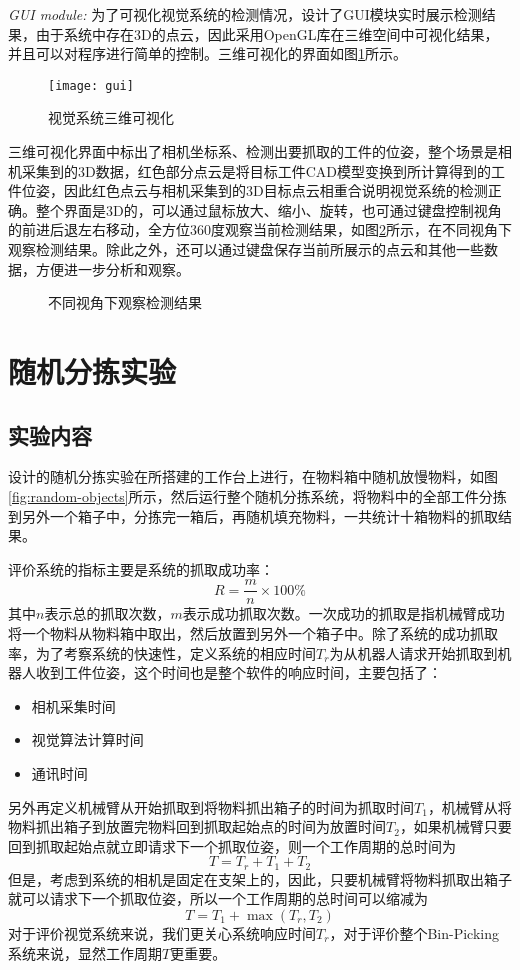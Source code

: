 \emph{GUI module:}
为了可视化视觉系统的检测情况，设计了GUI模块实时展示检测结果，由于系统中存在3D的点云，因此采用OpenGL库在三维空间中可视化结果，并且可以对程序进行简单的控制。三维可视化的界面如图\ref{fig:gui}所示。
\begin{figure}[ht]
  \centering
  \texttt{[image: gui]}
  \caption{视觉系统三维可视化}
  \label{fig:gui}
\end{figure}
三维可视化界面中标出了相机坐标系、检测出要抓取的工件的位姿，整个场景是相机采集到的3D数据，红色部分点云是将目标工件CAD模型变换到所计算得到的工件位姿，因此红色点云与相机采集到的3D目标点云相重合说明视觉系统的检测正确。整个界面是3D的，可以通过鼠标放大、缩小、旋转，也可通过键盘控制视角的前进后退左右移动，全方位360度观察当前检测结果，如图\ref{fig:view-pose}所示，在不同视角下观察检测结果。除此之外，还可以通过键盘保存当前所展示的点云和其他一些数据，方便进一步分析和观察。
\begin{figure}[ht]
  \centering
  \hfill
  \caption{不同视角下观察检测结果}
  \label{fig:view-pose}
\end{figure}

\section{随机分拣实验}
\subsection{实验内容}
设计的随机分拣实验在所搭建的工作台上进行，在物料箱中随机放慢物料，如图\ref{fig:random-objects}所示，然后运行整个随机分拣系统，将物料中的全部工件分拣到另外一个箱子中，分拣完一箱后，再随机填充物料，一共统计十箱物料的抓取结果。

评价系统的指标主要是系统的抓取成功率：
\begin{equation}
  R = \frac{m}{n}\times 100\%
\end{equation}
其中$n$表示总的抓取次数，$m$表示成功抓取次数。一次成功的抓取是指机械臂成功将一个物料从物料箱中取出，然后放置到另外一个箱子中。除了系统的成功抓取率，为了考察系统的快速性，定义系统的相应时间$T_r$为从机器人请求开始抓取到机器人收到工件位姿，这个时间也是整个软件的响应时间，主要包括了：
\begin{itemize}
\item 相机采集时间
\item 视觉算法计算时间
\item 通讯时间
\end{itemize}
另外再定义机械臂从开始抓取到将物料抓出箱子的时间为抓取时间$T_1$，机械臂从将物料抓出箱子到放置完物料回到抓取起始点的时间为放置时间$T_2$，如果机械臂只要回到抓取起始点就立即请求下一个抓取位姿，则一个工作周期的总时间为
\begin{equation}
  T = T_r + T_1 + T_2
\end{equation}
但是，考虑到系统的相机是固定在支架上的，因此，只要机械臂将物料抓取出箱子就可以请求下一个抓取位姿，所以一个工作周期的总时间可以缩减为
\begin{equation}
  T = T_1 + \max(T_r,T_2)
\end{equation}
对于评价视觉系统来说，我们更关心系统响应时间$T_r$，对于评价整个Bin-Picking系统来说，显然工作周期$T$更重要。
